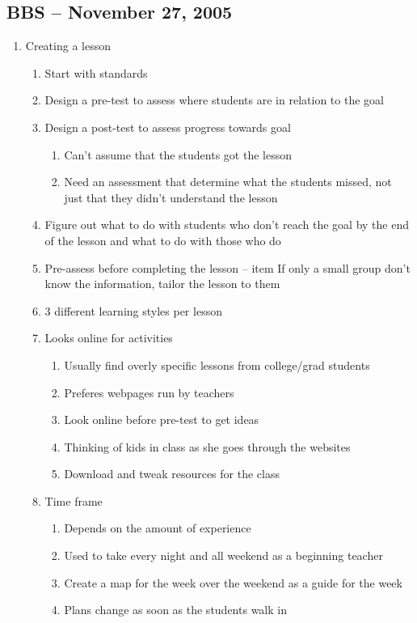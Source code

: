 \subsection{BBS -- November 27, 2005}
\begin{enumerate}
\item Creating a lesson
	\begin{enumerate}
	\item Start with standards
	\item Design a pre-test to assess where students are in relation to the goal
	\item Design a post-test to assess progress towards goal
		\begin{enumerate}
		\item Can't assume that the students got the lesson
		\item Need an assessment that determine what the students missed, not
			just that they didn't understand the lesson
		\end{enumerate}
	\item Figure out what to do with students who don't reach the goal by the
		end of the lesson and what to do with those who do
	\item Pre-assess before completing the lesson -- item If only a small group
		don't know the information, tailor the lesson to them
	\item 3 different learning styles per lesson
	\item Looks online for activities
		\begin{enumerate}
		\item Usually find overly specific lessons from college/grad students
		\item Preferes webpages run by teachers
		\item Look online before pre-test to get ideas
		\item Thinking of kids in class as she goes through the websites
		\item Download and tweak resources for the class
		\end{enumerate}
	\item Time frame
		\begin{enumerate}
		\item Depends on the amount of experience
		\item Used to take every night and all weekend as a beginning teacher
		\item Create a map for the week over the weekend as a guide for the week
		\item Plans change as soon as the students walk in

\end{enumerate}
\end{enumerate}
\end{enumerate}

